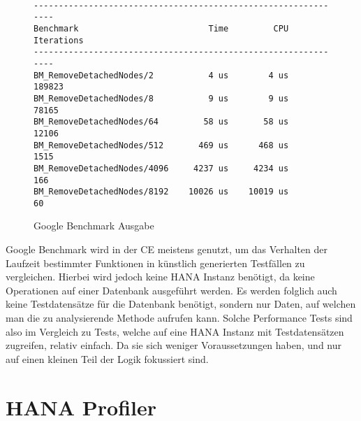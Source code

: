 \begin{figure}[h]
    \begin{center}
        \begin{verbatim}

---------------------------------------------------------------
Benchmark                          Time         CPU Iterations 
---------------------------------------------------------------
BM_RemoveDetachedNodes/2           4 us        4 us     189823 
BM_RemoveDetachedNodes/8           9 us        9 us      78165 
BM_RemoveDetachedNodes/64         58 us       58 us      12106 
BM_RemoveDetachedNodes/512       469 us      468 us       1515 
BM_RemoveDetachedNodes/4096     4237 us     4234 us        166 
BM_RemoveDetachedNodes/8192    10026 us    10019 us         60 
        \end{verbatim}
    \end{center}
    \caption{Google Benchmark Ausgabe}\label{fig:google_benchmark_ausgabe}
\end{figure}

Google Benchmark wird in der \ac{CE} meistens genutzt, um das Verhalten der
Laufzeit bestimmter Funktionen in künstlich generierten Testfällen zu
vergleichen. Hierbei wird jedoch keine HANA Instanz benötigt, da
keine Operationen auf einer Datenbank ausgeführt werden. Es werden folglich
auch keine Testdatensätze für die Datenbank benötigt, sondern nur Daten, auf
welchen man die zu analysierende Methode aufrufen kann. Solche Performance
Tests sind also im Vergleich zu Tests, welche auf eine HANA Instanz mit
Testdatensätzen zugreifen, relativ einfach. Da sie sich weniger Voraussetzungen
haben, und nur auf einen kleinen Teil der Logik fokussiert sind.

\section{HANA Profiler}
\label{sec:hana_profiler}
